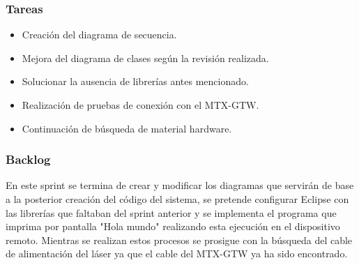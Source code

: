 \subsubsection{Tareas}
\begin{itemize}
	\item Creación del diagrama de secuencia.
	\item Mejora del diagrama de clases según la revisión realizada.
	\item Solucionar la ausencia de librerías antes mencionado.
	\item Realización de pruebas de conexión con el MTX-GTW.
	\item Continuación de búsqueda de material hardware.
\end{itemize}
\subsubsection{Backlog}
En este sprint se termina de crear y modificar los diagramas que servirán de base a la posterior creación del código del sistema, se pretende configurar Eclipse con las librerías que faltaban del sprint anterior y se implementa el programa que imprima por pantalla "Hola mundo" realizando esta ejecución en el dispositivo remoto. Mientras se realizan estos procesos se prosigue con la búsqueda del cable de alimentación del láser ya que el cable del MTX-GTW ya ha sido encontrado.\\
